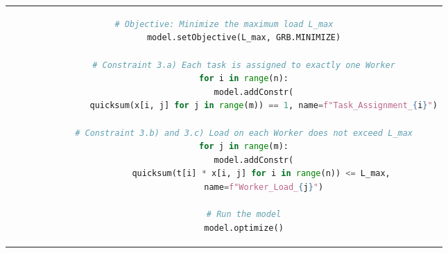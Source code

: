 \begin{enumerate}
\begin{figure}[htpb]
\begin{tabular}{c}
\begin{lstlisting}[language=Python]
        # Objective: Minimize the maximum load L_max
        model.setObjective(L_max, GRB.MINIMIZE)
        
        # Constraint 3.a) Each task is assigned to exactly one Worker
        for i in range(n):
            model.addConstr(
                quicksum(x[i, j] for j in range(m)) == 1, name=f"Task_Assignment_{i}")
        
        # Constraint 3.b) and 3.c) Load on each Worker does not exceed L_max
        for j in range(m):
            model.addConstr(
                quicksum(t[i] * x[i, j] for i in range(n)) <= L_max, 
                name=f"Worker_Load_{j}")
        
        # Run the model
        model.optimize()
        \end{lstlisting}
      \end{tabular}
      \label{fig:lp-optimization}
    \end{figure}

\end{enumerate}
